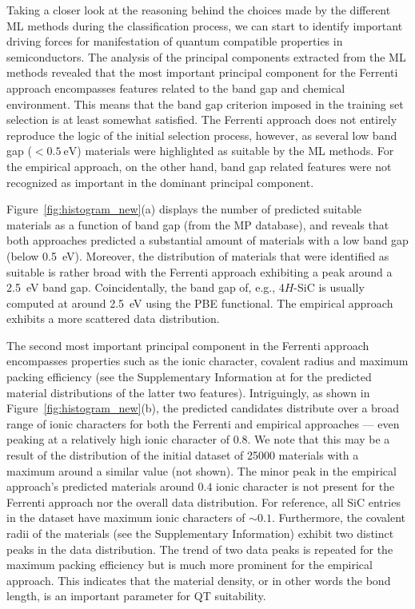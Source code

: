 \documentclass[superscriptaddress,
preprint,
 amsmath,amssymb,
 aps,
]{revtex4-2}
\begin{document}
Taking a closer look at the reasoning behind the choices made by the different ML methods during the classification process, we can start to identify important driving forces for manifestation of quantum compatible properties in semiconductors. 
The analysis of the principal components extracted from the ML methods revealed that the most important principal component for the Ferrenti approach encompasses features related to the band gap and chemical environment. This means that the band gap criterion imposed in the training set selection is at least somewhat satisfied. 
The Ferrenti approach does not entirely reproduce the logic of the initial selection process, however, as several low band gap ($ < \SI{0.5}{\electronvolt}$) materials were highlighted as suitable by the ML methods.  
For the empirical approach, on the other hand, band gap related features were not recognized as important in the dominant principal component. 

Figure~\ref{fig:histogram_new}(a) displays the number of predicted suitable materials as a function of band gap (from the MP database), and reveals that both approaches predicted a substantial amount of materials with a low band gap (below \SI{0.5}{\electronvolt}). 
Moreover, the distribution of materials that were identified as suitable is rather broad with the Ferrenti approach exhibiting a peak around a \SI{2.5}{\electronvolt} band gap. 
Coincidentally, the band gap of, e.g., 4$H$-SiC is usually computed at around \SI{2.5}{\electronvolt} using the PBE functional. 
The empirical approach exhibits a more scattered data distribution. %

The second most important principal component in the Ferrenti approach encompasses properties such as the ionic character, covalent radius and maximum packing efficiency (see the Supplementary Information at \cite{supplementary} for the predicted material distributions of the latter two features).  
Intriguingly, as shown in  Figure~\ref{fig:histogram_new}(b), the predicted candidates distribute over a broad range of ionic characters for both the Ferrenti and empirical approaches --- even peaking at a relatively high ionic character of $0.8$. 
We note that this may be a result of the distribution of the initial dataset of \num{25000} materials with a maximum around a similar value (not shown). The minor peak in the empirical approach's predicted materials around $0.4$ ionic character is not present for the Ferrenti approach nor the overall data distribution. For reference, all SiC entries in the dataset have maximum ionic characters of $\sim 0.1$. 
Furthermore, the covalent radii of the materials (see the Supplementary Information) exhibit two distinct peaks in the data distribution. 
The trend of two data peaks is repeated for the maximum packing efficiency but is much more prominent for the empirical approach. This indicates that the material density, or in other words the bond length, is an important parameter for QT suitability.  
\end{document}
